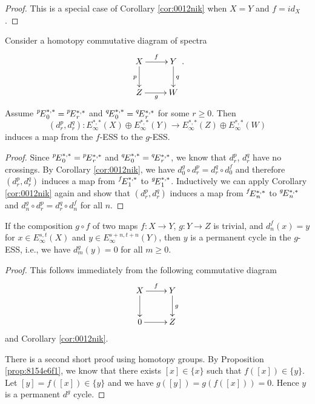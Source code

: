 \documentclass{amsart}
\numberwithin{equation}{section}
\newcommand{\ESS}[1]{\prescript{#1\!}{}{E}}
\begin{document}
\begin{proof}
This is a special case of Corollary \ref{cor:0012nik} when $X=Y$ and $f=id_X$.
\end{proof}

\begin{corollary}\label{cor:e7b20ae2}
    Consider a homotopy commutative diagram of spectra
    $$\xymatrix{
    X \ar[r]^{f}\ar[d]_{p} & Y\ar[d]^{q}\\
    Z \ar[r]_{g} & W
    }.$$
    Assume $\ESS{p}_0^{*,*}=\ESS{p}_r^{*,*}$ and $\ESS{q}_0^{*,*}=\ESS{q}_r^{*,*}$ for some $r\ge 0$. Then 
    $$(d^p_r, d^q_r): E_\infty^{*,*}(X)\oplus E_\infty^{*,*}(Y)\to E_\infty^{*,*}(Z)\oplus E_\infty^{*,*}(W)$$
    induces a map from the $f$-ESS to the $g$-ESS.
\end{corollary}

\begin{proof}
    Since $\ESS{p}_0^{*,*}=\ESS{p}_r^{*,*}$ and $\ESS{q}_0^{*,*}=\ESS{q}_r^{*,*}$, we know that $d^p_r$, $d^q_r$ have no crossings. By Corollary \ref{cor:0012nik}, we have $d^g_0\circ d^p_r = d^q_r\circ d^f_0$ and therefore $(d^p_r, d^q_r)$ induces a map from $\ESS{f}_1^{*,*}$ to $\ESS{g}_1^{*,*}$. Inductively we can apply Corollary \ref{cor:0012nik} again and show that $(d^p_r, d^q_r)$ induces a map from $\ESS{f}_n^{*,*}$ to $\ESS{g}_n^{*,*}$ and $d^g_n\circ d^p_r = d^q_r\circ d^f_n$ for all $n$.
\end{proof}

\begin{corollary}\label{cor:aed3d1a4}
    If the composition $g\circ f$ of two maps $f:X\to Y$, $g:Y\to Z$ is trivial, and $d_n^f(x)=y$ for $x\in E_\infty^{s,t}(X)$ and $y\in E_\infty^{s+n,t+n}(Y)$, then $y$ is a permanent cycle in the $g$-ESS, i.e., we have
    $d^g_m(y)=0$ for all $m\ge 0$.
\end{corollary}

\begin{proof}
    This follows immediately from the following commutative diagram
    $$\xymatrix{
    X \ar[r]^{f}\ar[d] & Y\ar[d]^{g}\\
    0 \ar[r] & Z
    }$$
    and Corollary \ref{cor:0012nik}.

    There is a second short proof using homotopy groups. By Proposition \ref{prop:8154e6f1}, we know that there exists $[x]\in \{x\}$ such that $f([x])\in \{y\}$. Let $[y]=f([x])\in \{y\}$ and we have $g([y])=g(f([x]))=0$. Hence $y$ is a permanent $d^g$ cycle.
\end{proof}
\end{document}
